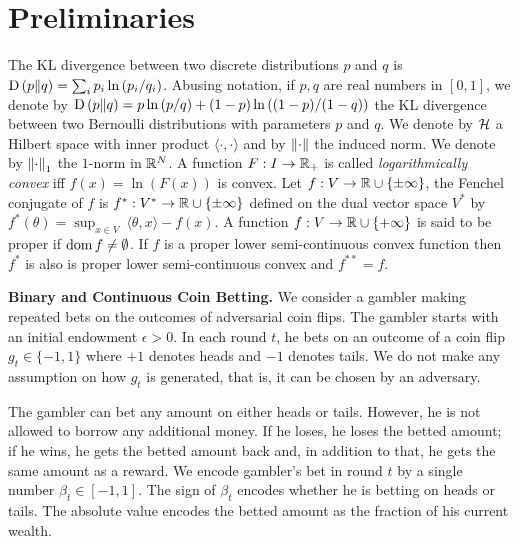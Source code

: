 \section{Preliminaries}
\label{section:preliminaries}

The \ac{KL} divergence between two discrete distributions $p$ and $q$
is $\operatorname{D}\left({p}\middle\|{q}\right) = \sum_{i} p_i \ln\left( p_i/q_i \right)$. Abusing
notation, if $p,q$ are real numbers in $[0,1]$, we denote by $\operatorname{D}\left({p}\middle\|{q}\right) = p \ln
\left(p/q \right) + (1-p) \ln \left((1-p)/(1-q) \right)$ the
\ac{KL} divergence between two Bernoulli distributions with parameters
$p$ and $q$.  We denote by $\mathcal{H}$ a Hilbert space with inner product $\langle
\cdot, \cdot\rangle$ and by $\left\|{\cdot}\right\|$ the induced norm.  We denote by
$\left\|{\cdot}\right\|_1$ the $1$-norm in $\mathbb{R}^N$.  A function $F:I \to \mathbb{R}_+$ is called
\emph{logarithmically convex} iff $f(x) = \ln(F(x))$ is convex.
Let $f:V \to \mathbb{R} \cup \{\pm\infty\}$, the Fenchel conjugate of $f$ is $f^*:V^*
\to \mathbb{R} \cup \{\pm \infty\}$ defined on the dual vector space $V^*$ by
$f^*(\theta) = \sup_{x \in V} \ \langle \theta, x \rangle - f(x)$.  A function
$f:V \to \mathbb{R} \cup \{+ \infty\}$ is said to be proper if $\operatorname*{dom} f \neq \emptyset$.
If $f$ is a proper lower semi-continuous convex function then $f^*$ is also is
proper lower semi-continuous convex and $f^{**}=f$.

\textbf{Binary and Continuous Coin Betting.} We consider a gambler making
repeated bets on the outcomes of adversarial coin flips. The gambler starts with an
initial endowment $\epsilon > 0$. In each round $t$, he bets on an outcome of a
coin flip $g_t \in \{-1,1\}$ where $+1$ denotes heads and $-1$ denotes tails.
We do not make any assumption on how $g_t$ is generated, that is, it can be
chosen by an adversary.

The gambler can bet any amount on either heads or tails. However, he is not
allowed to borrow any additional money. If he loses, he loses the betted amount; if he wins, he gets the betted amount back and, in addition to that, he
gets the same amount as a reward.  We encode gambler's bet in round $t$ by a
single number $\beta_t \in [-1,1]$. The sign of $\beta_t$ encodes whether he is
betting on heads or tails. The absolute value encodes the betted amount as the
fraction of his current wealth.

